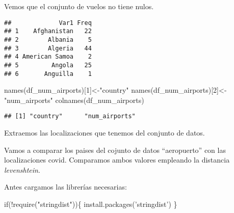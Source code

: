 \documentclass[
]{article}
\newenvironment{Shaded}{\begin{snugshade}}{\end{snugshade}}
\newcommand{\ControlFlowTok}[1]{\textcolor[rgb]{0.94,0.87,0.69}{#1}}
\newcommand{\DecValTok}[1]{\textcolor[rgb]{0.86,0.86,0.80}{#1}}
\newcommand{\KeywordTok}[1]{\textcolor[rgb]{0.94,0.87,0.69}{#1}}
\newcommand{\NormalTok}[1]{\textcolor[rgb]{0.80,0.80,0.80}{#1}}
\newcommand{\OperatorTok}[1]{\textcolor[rgb]{0.94,0.94,0.82}{#1}}
\newcommand{\StringTok}[1]{\textcolor[rgb]{0.80,0.58,0.58}{#1}}
\begin{document}
Vemos que el conjunto de vuelos no tiene nulos.

\begin{Shaded}
\end{Shaded}

\begin{verbatim}
##             Var1 Freq
## 1    Afghanistan   22
## 2        Albania    5
## 3        Algeria   44
## 4 American Samoa    2
## 5         Angola   25
## 6       Anguilla    1
\end{verbatim}

\begin{Shaded}
\begin{Highlighting}[]
\KeywordTok{names}\NormalTok{(df_num_airports)[}\DecValTok{1}\NormalTok{]<-}\StringTok{"country"}
\KeywordTok{names}\NormalTok{(df_num_airports)[}\DecValTok{2}\NormalTok{]<-}\StringTok{"num_airports"}
\KeywordTok{colnames}\NormalTok{(df_num_airports)}
\end{Highlighting}
\end{Shaded}

\begin{verbatim}
## [1] "country"      "num_airports"
\end{verbatim}

Extraemos las localizaciones que tenemos del conjunto de datos.

\begin{Shaded}
\end{Shaded}

Vamos a comparar los paises del cojunto de datos ``aeropuerto'' con las
localizaciones covid. Comparamos ambos valores empleando la distancia
\emph{levenshtein}.

Antes cargamos las librerías necesarias:

\begin{Shaded}
\begin{Highlighting}[]
\ControlFlowTok{if}\NormalTok{(}\OperatorTok{!}\KeywordTok{require}\NormalTok{(}\StringTok{"stringdist"}\NormalTok{))\{}
  \KeywordTok{install.packages}\NormalTok{(}\StringTok{'stringdist'}\NormalTok{) }
\NormalTok{\}}
\end{Highlighting}
\end{Shaded}
\end{document}
